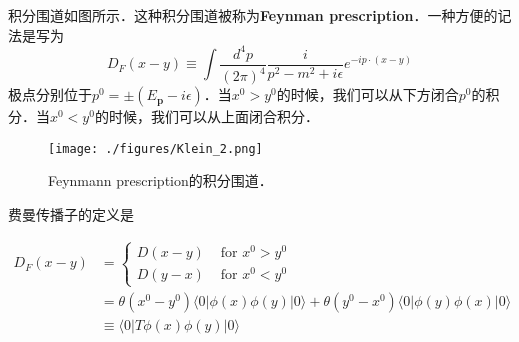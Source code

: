 积分围道如图所示．这种积分围道被称为\textbf{Feynman prescription}．一种方便的记法是写为
\begin{equation}
D_F(x-y) \equiv \int \frac{d^4p}{(2\pi)^4} \frac{i}{p^2-m^2+i\epsilon} e^{-ip\cdot(x-y)}
\end{equation}
极点分别位于$p^0 = \pm(E_{\mathbf p}-i\epsilon)$．当$x^0>y^0$的时候，我们可以从下方闭合$p^0$的积分．当$x^0<y^0$的时候，我们可以从上面闭合积分．
\begin{figure}[ht]
\centering
\texttt{[image: ./figures/Klein\_2.png]}
\caption{Feynmann prescription的积分围道．} \label{Klein_fig2}
\end{figure}

费曼传播子的定义是

\begin{equation}
\begin{aligned}
D_{F}(x-y) &= \begin{cases}D(x-y) & \text { for } x^{0}>y^{0} \\
D(y-x) & \text { for } x^{0}<y^{0}\end{cases} \\
&=\theta\left(x^{0}-y^{0}\right)\langle 0|\phi(x) \phi(y)| 0\rangle+\theta\left(y^{0}-x^{0}\right)\langle 0|\phi(y) \phi(x)| 0\rangle \\
& \equiv\langle 0|T \phi(x) \phi(y)| 0\rangle
\end{aligned}
\end{equation}
